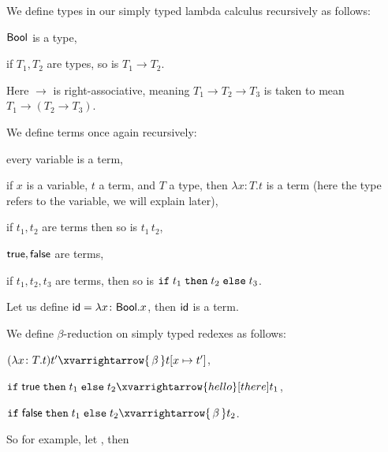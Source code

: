 \bdefn

    We define {\emphcolor types} in our simply typed lambda calculus recursively as follows:
    \benum
        \item ${\sf Bool}$ is a type,
        \item if $T_1,T_2$ are types, so is $T_1\to T_2$.
    \eenum

\edefn

Here $\to$ is right-associative, meaning $T_1\to T_2\to T_3$ is taken to mean $T_1\to(T_2\to T_3)$.

\bdefn

    We define terms once again recursively:
    \benum
        \item every variable is a term,
        \item if $x$ is a variable, $t$ a term, and $T$ a type, then $\lambda x\colon T.t$ is a term (here the type refers to the variable, we will explain later),
        \item if $t_1,t_2$ are terms then so is $t_1\,t_2$,
        \item ${\sf true},{\sf false}$ are terms,
        \item if $t_1,t_2,t_3$ are terms, then so is ${\tt if\;}t_1{\tt\;then\;}t_2{\tt\;else\;}t_3$.
    \eenum

\edefn

Let us define $\id=\lambda x\colon{\sf Bool}.x$, then ${\sf id}$ is a term.

\bdefn

    We define $\beta$-reduction on simply typed redexes as follows:
    \benum
        \item $(\lambda x\colon T.t)t'\xvarrightarrow{\,\beta\,}t[x\mapsto t']$,
        \item ${\tt if\;}{\sf true}{\tt\;then\;}t_1{\tt\;else\;}t_2\xvarrightarrow{hello}[there]t_1$,
        \item ${\tt if\;}{\sf false}{\tt\;then\;}t_1{\tt\;else\;}t_2\xvarrightarrow{\,\beta\,}t_2$.
    \eenum

\edefn

So for example, let , then



